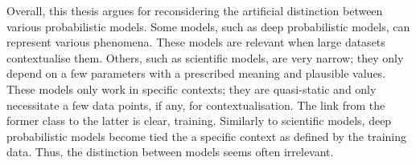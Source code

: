 Overall, this thesis argues for reconsidering the artificial distinction between various probabilistic models. Some models, such as deep probabilistic models, can represent various phenomena. These models are relevant when large datasets contextualise them. Others, such as scientific models, are very narrow; they only depend on a few parameters with a prescribed meaning and plausible values. These models only work in specific contexts; they are quasi-static and only necessitate a few data points, if any, for contextualisation. The link from the former class to the latter is clear, training. Similarly to scientific models, deep probabilistic models become tied the a specific context as defined by the training data. Thus, the distinction between models seems often irrelevant.
%
%
%
%




